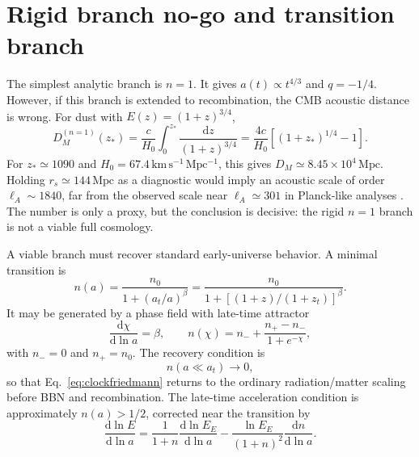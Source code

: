 \documentclass[aps,prd,reprint,nofootinbib,superscriptaddress,longbibliography]{revtex4-2}
\newcommand{\dd}{\mathrm{d}}
\newcommand{\Mpc}{\,\mathrm{Mpc}}
\newcommand{\kmsMpc}{\,\mathrm{km\,s^{-1}\,Mpc^{-1}}}
\begin{document}
\section{Rigid branch no-go and transition branch}

The simplest analytic branch is $n=1$.  It gives $a(t)\propto t^{4/3}$ and $q=-1/4$.  However, if this branch is extended to recombination, the CMB acoustic distance is wrong.  For dust with $E(z)=(1+z)^{3/4}$,
\begin{equation}
  D_M^{(n=1)}(z_*)=\frac{c}{H_0}\int_0^{z_*}\frac{\dd z}{(1+z)^{3/4}}
  =\frac{4c}{H_0}\left[(1+z_*)^{1/4}-1\right].
\end{equation}
For $z_*\simeq1090$ and $H_0=67.4\kmsMpc$, this gives $D_M\simeq 8.45\times10^4\Mpc$.  Holding $r_s\simeq144\Mpc$ as a diagnostic would imply an acoustic scale of order $\ell_A\sim1840$, far from the observed scale near $\ell_A\simeq301$ in Planck-like analyses \cite{Planck2018}.  The number is only a proxy, but the conclusion is decisive: the rigid $n=1$ branch is not a viable full cosmology.

A viable branch must recover standard early-universe behavior.  A minimal transition is
\begin{equation}
  n(a)=\frac{n_0}{1+(a_t/a)^\beta}
  =\frac{n_0}{1+[(1+z)/(1+z_t)]^\beta} .
  \label{eq:transition}
\end{equation}
It may be generated by a phase field with late-time attractor
\begin{equation}
  \frac{\dd\chi}{\dd\ln a}=\beta,
  \qquad
  n(\chi)=n_-+\frac{n_+-n_-}{1+e^{-\chi}},
\end{equation}
with $n_-=0$ and $n_+=n_0$.  The recovery condition is
\begin{equation}
  n(a\ll a_t)\to0,
\end{equation}
so that Eq.~\eqref{eq:clockfriedmann} returns to the ordinary radiation/matter scaling before BBN and recombination.  The late-time acceleration condition is approximately $n(a)>1/2$, corrected near the transition by
\begin{equation}
  \frac{\dd\ln E}{\dd\ln a}
  =\frac{1}{1+n}\frac{\dd\ln E_E}{\dd\ln a}
  -\frac{\ln E_E}{(1+n)^2}\frac{\dd n}{\dd\ln a} .
  \label{eq:dlnE}
\end{equation}
\end{document}
